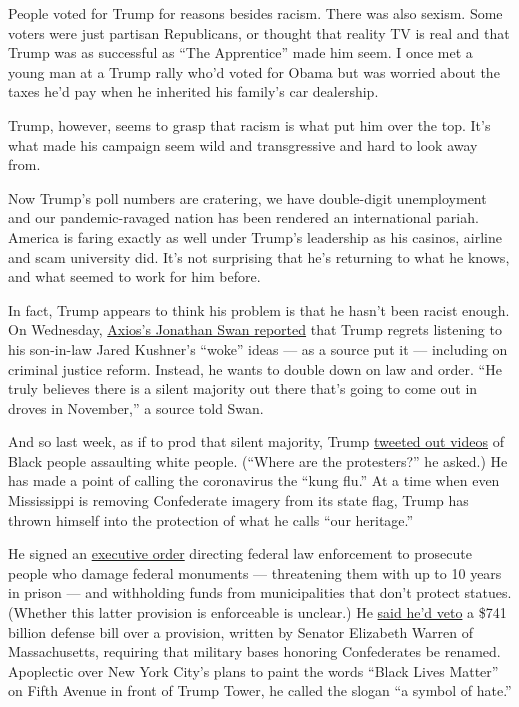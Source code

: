 People voted for Trump for reasons besides racism. There was also
sexism. Some voters were just partisan Republicans, or thought that
reality TV is real and that Trump was as successful as ``The
Apprentice'' made him seem. I once met a young man at a Trump rally
who'd voted for Obama but was worried about the taxes he'd pay when he
inherited his family's car dealership.

Trump, however, seems to grasp that racism is what put him over the top.
It's what made his campaign seem wild and transgressive and hard to look
away from.

Now Trump's poll numbers are cratering, we have double-digit
unemployment and our pandemic-ravaged nation has been rendered an
international pariah. America is faring exactly as well under Trump's
leadership as his casinos, airline and scam university did. It's not
surprising that he's returning to what he knows, and what seemed to work
for him before.

In fact, Trump appears to think his problem is that he hasn't been
racist enough. On Wednesday,
\href{https://www.axios.com/trump-kushner-second-thoughts-408d5a33-725d-442a-88e4-d6ab6742c139.html}{Axios's
Jonathan Swan reported} that Trump regrets listening to his son-in-law
Jared Kushner's ``woke'' ideas --- as a source put it --- including on
criminal justice reform. Instead, he wants to double down on law and
order. ``He truly believes there is a silent majority out there that's
going to come out in droves in November,'' a source told Swan.

And so last week, as if to prod that silent majority, Trump
\href{https://www.washingtonpost.com/nation/2020/06/23/trump-videos-black-violence-protests/}{tweeted
out videos} of Black people assaulting white people. (``Where are the
protesters?'' he asked.) He has made a point of calling the coronavirus
the ``kung flu.'' At a time when even Mississippi is removing
Confederate imagery from its state flag, Trump has thrown himself into
the protection of what he calls ``our heritage.''

He signed an
\href{https://www.vox.com/policy-and-politics/2020/6/27/21305396/trump-confederate-monuments-executive-order}{executive
order} directing federal law enforcement to prosecute people who damage
federal monuments --- threatening them with up to 10 years in prison ---
and withholding funds from municipalities that don't protect statues.
(Whether this latter provision is enforceable is unclear.) He
\href{https://www.nytimes.com/aponline/2020/07/01/us/politics/ap-us-congress-confederate-symbols.html}{said
he'd veto} a \$741 billion defense bill over a provision, written by
Senator Elizabeth Warren of Massachusetts, requiring that military bases
honoring Confederates be renamed. Apoplectic over New York City's plans
to paint the words ``Black Lives Matter'' on Fifth Avenue in front of
Trump Tower, he called the slogan ``a symbol of hate.''


